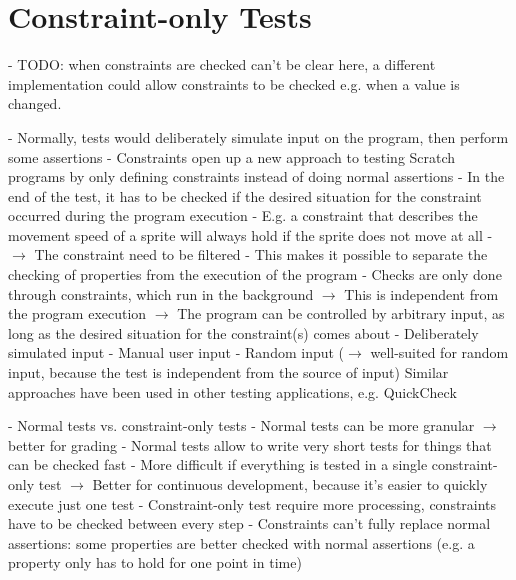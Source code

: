 \section{Constraint-only Tests}%
\label{sec:constraint_only_tests}

- TODO: when constraints are checked can't be clear here, a different implementation could allow constraints to be checked e.g. when a value is changed.

- Normally, tests would deliberately simulate input on the program, then perform some assertions
- Constraints open up a new approach to testing Scratch programs by only defining constraints instead of doing normal assertions
- In the end of the test, it has to be checked if the desired situation for the constraint occurred during the program execution
    - E.g. a constraint that describes the movement speed of a sprite will always hold if the sprite does not move at all
    - $\rightarrow$ The constraint need to be filtered
- This makes it possible to separate the checking of properties from the execution of the program
    - Checks are only done through constraints, which run in the background
    $\rightarrow$ This is independent from the program execution
    $\rightarrow$ The program can be controlled by arbitrary input, as long as the desired situation for the constraint(s) comes about
        - Deliberately simulated input
        - Manual user input
        - Random input ($\rightarrow$ well-suited for random input, because the test is independent from the source of input)
          Similar approaches have been used in other testing applications, e.g. QuickCheck \cite{quickcheck}

- Normal tests vs. constraint-only tests
    - Normal tests can be more granular $\rightarrow$ better for grading
    - Normal tests allow to write very short tests for things that can be checked fast
        - More difficult if everything is tested in a single constraint-only test
        $\rightarrow$ Better for continuous development, because it's easier to quickly execute just one test
    - Constraint-only test require more processing, constraints have to be checked between every step
    - Constraints can't fully replace normal assertions: some properties are better checked with normal assertions (e.g. a property only has to hold for one point in time)

